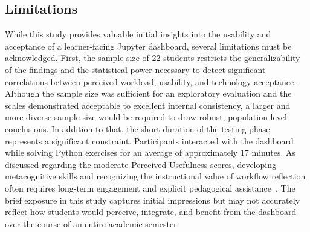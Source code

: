 \subsection{Limitations}
While this study provides valuable initial insights into the usability and acceptance of a learner-facing Jupyter dashboard, several limitations must be acknowledged. First, the sample size of 22 students restricts the generalizability of the findings and the statistical power necessary to detect significant correlations between perceived workload, usability, and technology acceptance. Although the sample size was sufficient for an exploratory evaluation and the scales demonstrated acceptable to excellent internal consistency, a larger and more diverse sample size would be required to draw robust, population-level conclusions. In addition to that, the short duration of the testing phase represents a significant constraint. Participants interacted with the dashboard while solving Python exercises for an average of approximately 17 minutes. As discussed regarding the moderate Perceived Usefulness scores, developing metacognitive skills and recognizing the instructional value of workflow reflection often requires long-term engagement and explicit pedagogical assistance~\cite{corrin2014exploring}. The brief exposure in this study captures initial impressions but may not accurately reflect how students would perceive, integrate, and benefit from the dashboard over the course of an entire academic semester.

